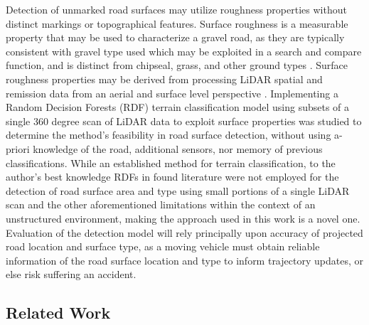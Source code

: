 \documentclass[journal,onecolumn]{IEEEtran}
\begin{document}
	{Detection of unmarked road surfaces may utilize roughness properties without distinct markings or topographical features. Surface roughness is a measurable property that may be used to characterize a gravel road, as they are typically consistent with gravel type used \cite{skorseth_gravel_nodate} which may be exploited in a search and compare function, and is distinct from chipseal, grass, and other ground types \cite{wan_road_2007, levi_3d_2012_light, levi_3d_2012_terrain}. Surface roughness properties may be derived from processing LiDAR spatial and remission data from an aerial and surface level perspective \cite{wan_road_2007, levi_3d_2012_light, levi_3d_2012_terrain, pollyea_experimental_2012,rychkov_computational_2012,lague_accurate_2013,brubaker_use_2013,turner_estimation_2014,campbell_lidar-based_2017,shepard_roughness_2001,tegowski_statistical_2016,sock_probabilistic_2016,milenkovic_roughness_2018,yadav_extraction_2017, yadav_rural_2018}. Implementing a Random Decision Forests (RDF) terrain classification model using subsets of a single 360 degree scan of LiDAR data to exploit surface properties was studied to determine the method's feasibility in road surface detection, without using a-priori knowledge of the road, additional sensors, nor memory of previous classifications. While an established method for terrain classification, to the author's best knowledge RDFs in found literature were not employed for the detection of road surface area and type using small portions of a single LiDAR scan and the other aforementioned limitations within the context of an unstructured environment, making the approach used in this work is a novel one. Evaluation of the detection model will rely principally upon accuracy of projected road location and surface type, as a moving vehicle must obtain reliable information of the road surface location and type to inform trajectory updates, or else risk suffering an accident.}
	
	
	\subsection{Related Work}
	
\end{document}
